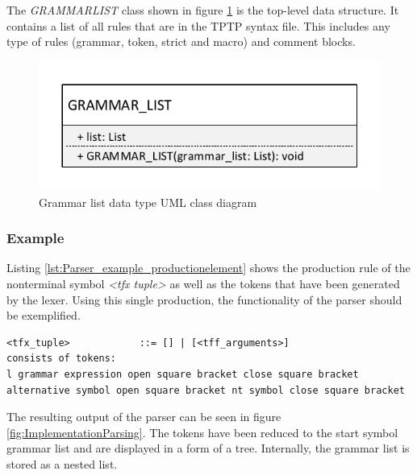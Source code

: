The \textit{GRAMMAR\textunderscore LIST} class shown in figure \ref{fig:ConceptGrammarListClassDiagram} is the top-level data structure. It contains a list of all rules that are in the \ac{TPTP} syntax file.
This includes any type of rules (grammar, token, strict and macro) and comment blocks. 

\begin{figure}[H]
\centering
\includegraphics[width=.5\textwidth]{images/Concept_uml_data_types_grammar_list.pdf}
\caption{Grammar list data type UML class diagram}
\label{fig:ConceptGrammarListClassDiagram}
\end{figure}

\subsubsection{Example}
Listing \ref{lst:Parser_example_productionelement} shows the production rule of the nonterminal symbol \textit{<tfx tuple>} as well as the tokens that have been generated by the lexer. Using this single production, the functionality of the parser should be exemplified. \\

\begin{lstlisting}[basicstyle=\scriptsize, caption= Production element, label= lst:Parser_example_productionelement]
<tfx_tuple>            ::= [] | [<tff_arguments>]
consists of tokens:
l grammar expression open square bracket close square bracket alternative symbol open square bracket nt symbol close square bracket
\end{lstlisting}

The resulting output of the parser can be seen in figure \ref{fig:ImplementationParsing}. The tokens have been reduced to the start symbol grammar list and are displayed in a form of a tree. Internally, the grammar list is stored as a nested list.

